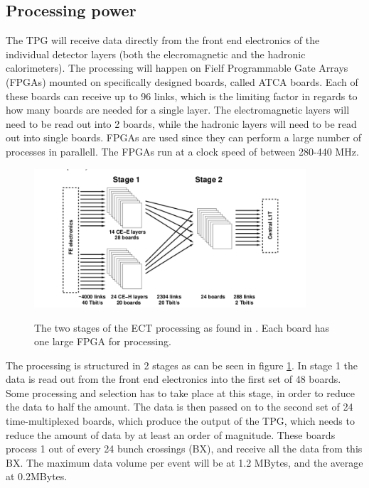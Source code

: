 \documentclass[12 pt]{article}
\begin{document}
		\subsection{Processing power}\label{processing}
			The TPG will receive data directly from the front end electronics of the individual detector layers \cite{TDR} (both the elecromagnetic and the hadronic calorimeters). The processing will happen on Fielf Programmable Gate Arrays (FPGAs) mounted on specifically designed boards, called ATCA boards. Each of these boards can receive up to 96 links, which is the limiting factor in regards to how many boards are needed for a single layer. The electromagnetic layers will need to be read out into 2 boards, while the hadronic layers will need to be read out into single boards. FPGAs are used since they can perform a large number of processes in parallell. The FPGAs run at a clock speed of between 280-440 MHz. 
			\begin{figure}[H]
				\centering
				\includegraphics[width=0.9\textwidth]{TPG-stages.png}
				\label{tgp-stages}
				\caption{The two stages of the ECT processing as found in \cite{TDR}. Each board has one large FPGA for processing.}
			\end{figure}

			The processing is structured in 2 stages as can be seen in figure \ref{tgp-stages}. In stage 1 the data is read out from the front end electronics into the first set of 48 boards. Some processing and selection has to take place at this stage, in order to reduce the data to half the amount. The data is then passed on to the second set of 24 time-multiplexed boards, which produce the output of the TPG, which needs to reduce the amount of data by at least an order of magnitude. These boards process 1 out of every 24 bunch crossings (BX), and receive all the data from this BX. The maximum data volume per event will be at 1.2 MBytes, and the average at 0.2MBytes. 
\end{document}
